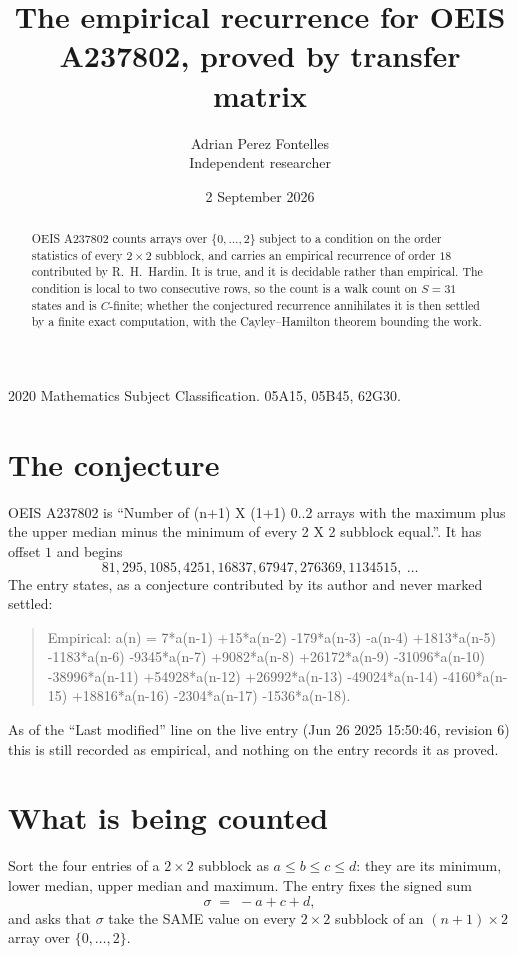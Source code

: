 \documentclass[11pt,a4paper]{article}
\title{The empirical recurrence for OEIS A237802, proved by transfer matrix}
\author{Adrian Perez Fontelles\\ \small Independent researcher}
\date{2 September 2026}
\theoremstyle{plain}
\theoremstyle{definition}
\begin{document}
\maketitle

\begin{abstract}
OEIS A237802 counts arrays over $\{0,\dots,2\}$ subject to a condition on the order
statistics of every $2\times2$ subblock, and carries an empirical recurrence of order
$18$ contributed by R.~H.~Hardin. It is true, and it is decidable rather than empirical.
The condition is local to two consecutive rows, so the count is a walk count on $S=31$
states and is $C$-finite; whether the conjectured recurrence annihilates it is then settled by
a finite exact computation, with the Cayley--Hamilton theorem bounding the work.
\end{abstract}

\noindent\small 2020 Mathematics Subject Classification. 05A15, 05B45, 62G30.\normalsize

\section{The conjecture}

OEIS A237802 is ``Number of (n+1) X (1+1) 0..2 arrays with the maximum plus the upper median minus the minimum of every 2 X 2 subblock equal.''. It has offset $1$ and begins
\[
81, 295, 1085, 4251, 16837, 67947, 276369, 1134515,\ \dots
\]
The entry states, as a conjecture contributed by its author and never marked settled:
\begin{quote}
Empirical: a(n) = 7*a(n-1) +15*a(n-2) -179*a(n-3) -a(n-4) +1813*a(n-5) -1183*a(n-6) -9345*a(n-7) +9082*a(n-8) +26172*a(n-9) -31096*a(n-10) -38996*a(n-11) +54928*a(n-12) +26992*a(n-13) -49024*a(n-14) -4160*a(n-15) +18816*a(n-16) -2304*a(n-17) -1536*a(n-18).
\end{quote}
As of the ``Last modified'' line on the live entry (Jun 26 2025 15:50:46, revision 6) this is still
recorded as empirical, and nothing on the entry records it as proved.

\section{What is being counted}

Sort the four entries of a $2\times2$ subblock as $a\le b\le c\le d$: they
are its minimum, lower median, upper median and maximum. The entry fixes the signed sum
\[
\sigma\;=\;-a+c+d,
\]
and asks that $\sigma$ take the SAME value on every $2\times2$ subblock of an
$(n+1)\times2$ array over $\{0,\dots,2\}$.
\end{document}
